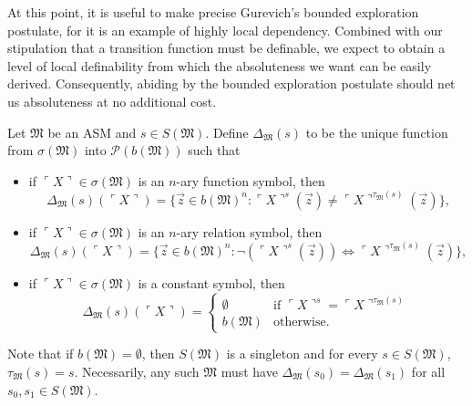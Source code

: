 \documentclass[12pt]{article}
\numberwithin{equation}{section}
\begin{document}
At this point, it is useful to make precise Gurevich's bounded exploration postulate, for it is an example of highly local dependency. Combined with our stipulation that a transition function must be definable, we expect to obtain a level of local definability from which the absoluteness we want can be easily derived. Consequently, abiding by the bounded exploration postulate should net us absoluteness at no additional cost.

\begin{defi}
Let $\mathfrak{M}$ be an ASM and $s \in S(\mathfrak{M})$. Define $\Delta_{\mathfrak{M}}(s)$ to be the unique function from $\sigma(\mathfrak{M})$ into $\mathcal{P}(b(\mathfrak{M}))$ such that
\begin{itemize}
    \item if $\ulcorner X \urcorner \in \sigma(\mathfrak{M})$ is an $n$-ary function symbol, then 
    \begin{equation*}
        \Delta_{\mathfrak{M}}(s)(\ulcorner X \urcorner) = \{\Vec{z} \in b(\mathfrak{M})^n : \ulcorner X \urcorner^{s}(\Vec{z}) \neq \ulcorner X \urcorner^{\tau_{\mathfrak{M}}(s)}(\Vec{z})\} \text{,}
    \end{equation*}
    \item if $\ulcorner X \urcorner \in \sigma(\mathfrak{M})$ is an $n$-ary relation symbol, then 
    \begin{equation*}
        \Delta_{\mathfrak{M}}(s)(\ulcorner X \urcorner) = \{\Vec{z} \in b(\mathfrak{M})^n : \neg (\ulcorner X \urcorner^{s}(\Vec{z})) \iff \ulcorner X \urcorner^{\tau_{\mathfrak{M}}(s)}(\Vec{z})\} \text{,}
    \end{equation*}
    \item if $\ulcorner X \urcorner \in \sigma(\mathfrak{M})$ is a constant symbol, then 
    \begin{equation*}
        \Delta_{\mathfrak{M}}(s)(\ulcorner X \urcorner) =
        \begin{cases}
            \emptyset & \text{if } \ulcorner X \urcorner^{s} = \ulcorner X \urcorner^{\tau_{\mathfrak{M}}(s)} \\
            b(\mathfrak{M}) & \text{otherwise.}
        \end{cases}
    \end{equation*}
\end{itemize}
Note that if $b(\mathfrak{M}) = \emptyset$, then $S(\mathfrak{M})$ is a singleton and for every $s \in S(\mathfrak{M})$, $\tau_{\mathfrak{M}}(s) = s$. Necessarily, any such $\mathfrak{M}$ must have $\Delta_{\mathfrak{M}}(s_0) = \Delta_{\mathfrak{M}}(s_1)$ for all $s_0, s_1 \in S(\mathfrak{M})$.
\end{defi}
\end{document}
